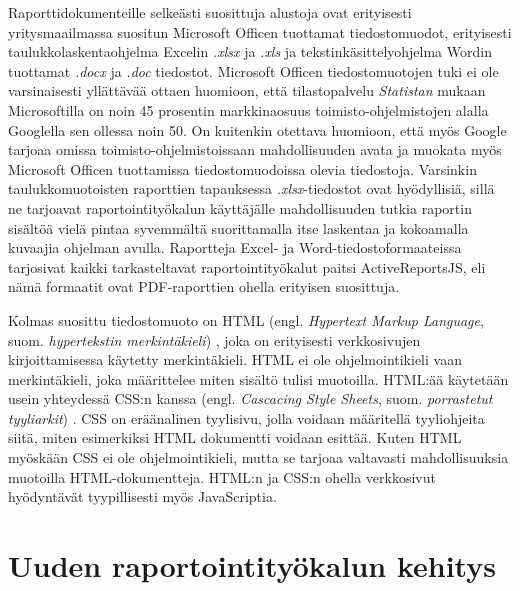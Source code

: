 Raporttidokumenteille selkeästi suosittuja alustoja ovat erityisesti yritysmaailmassa suositun Microsoft Officen tuottamat tiedostomuodot, erityisesti taulukkolaskentaohjelma Excelin \textit{.xlsx} ja \textit{.xls} ja tekstinkäsittelyohjelma Wordin tuottamat \textit{.docx} ja \textit{.doc} tiedostot. Microsoft Officen tiedostomuotojen tuki ei ole varsinaisesti yllättävää ottaen huomioon, että tilastopalvelu \textit{Statistan} mukaan Microsoftilla on noin 45 prosentin markkinaosuus toimisto-ohjelmistojen alalla Googlella sen ollessa noin 50. \cite{noauthor_office_nodate} On kuitenkin otettava huomioon, että myös Google tarjoaa omissa toimisto-ohjelmistoissaan mahdollisuuden avata ja muokata myös Microsoft Officen tuottamissa tiedostomuodoissa olevia tiedostoja. Varsinkin taulukkomuotoisten raporttien tapauksessa \textit{.xlsx}-tiedostot ovat hyödyllisiä, sillä ne tarjoavat raportointityökalun käyttäjälle mahdollisuuden tutkia raportin sisältöä vielä pintaa syvemmältä suorittamalla itse laskentaa ja kokoamalla kuvaajia ohjelman avulla. Raportteja Excel- ja Word-tiedostoformaateissa tarjosivat kaikki tarkasteltavat raportointityökalut paitsi ActiveReportsJS, eli nämä formaatit ovat PDF-raporttien ohella erityisen suosittuja.

Kolmas suosittu tiedostomuoto on HTML (engl. \textit{Hypertext Markup Language}, suom. \textit{hypertekstin merkintäkieli}) , joka on erityisesti verkkosivujen kirjoittamisessa käytetty merkintäkieli. HTML ei ole ohjelmointikieli vaan merkintäkieli, joka määrittelee miten sisältö tulisi muotoilla. HTML:ää käytetään usein yhteydessä CSS:n kanssa (engl. \textit{Cascacing Style Sheets}, suom. \textit{porrastetut tyyliarkit}) . CSS on eräänalinen tyylisivu, jolla voidaan määritellä tyyliohjeita siitä, miten esimerkiksi HTML dokumentti voidaan esittää. Kuten HTML myöskään CSS ei ole ohjelmointikieli, mutta se tarjoaa valtavasti mahdollisuuksia muotoilla HTML-dokumentteja. HTML:n ja CSS:n ohella verkkosivut hyödyntävät tyypillisesti myös JavaScriptia.

\section{Uuden raportointityökalun kehitys}

